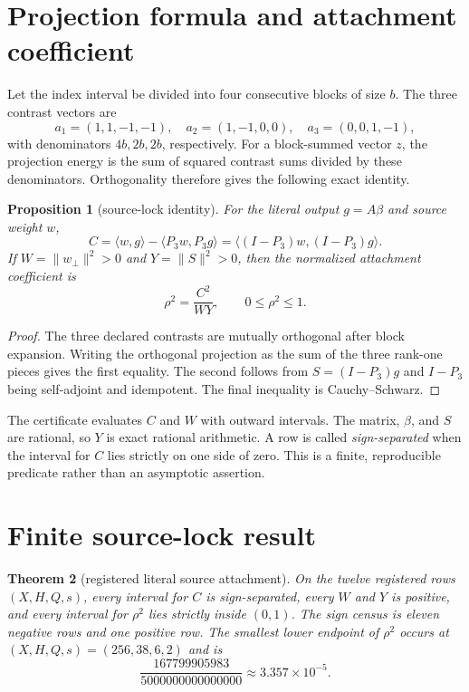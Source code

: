 \documentclass[11pt]{article}
\newtheorem{theorem}{Theorem}
\newtheorem{proposition}[theorem]{Proposition}
\begin{document}
\section{Projection formula and attachment coefficient}

Let the index interval be divided into four consecutive blocks of size $b$.
The three contrast vectors are
\[
 a_1=(1,1,-1,-1),\quad a_2=(1,-1,0,0),\quad
 a_3=(0,0,1,-1),
\]
with denominators $4b,2b,2b$, respectively.  For a block-summed vector $z$,
the projection energy is the sum of squared contrast sums divided by these
denominators.  Orthogonality therefore gives the following exact identity.

\begin{proposition}[source-lock identity]
For the literal output $g=A\beta$ and source weight $w$,
\[
 C=\langle w,g\rangle-\langle P_3w,P_3g\rangle
   =\langle (I-P_3)w,(I-P_3)g\rangle.
\]
If $W=\|w_\perp\|^2>0$ and $Y=\|S\|^2>0$, then the normalized attachment
coefficient is
\[
 \rho^2=\frac{C^2}{WY},\qquad 0\leq\rho^2\leq 1.
 \label{eq:rho}
\]
\end{proposition}

\begin{proof}
The three declared contrasts are mutually orthogonal after block expansion.
Writing the orthogonal projection as the sum of the three rank-one pieces
gives the first equality.  The second follows from $S=(I-P_3)g$ and
$I-P_3$ being self-adjoint and idempotent.  The final inequality is
Cauchy--Schwarz.
\end{proof}

The certificate evaluates $C$ and $W$ with outward intervals.  The matrix,
$\beta$, and $S$ are rational, so $Y$ is exact rational arithmetic.  A row is
called \emph{sign-separated} when the interval for $C$ lies strictly on one
side of zero.  This is a finite, reproducible predicate rather than an
asymptotic assertion.

\section{Finite source-lock result}

\begin{theorem}[registered literal source attachment]
On the twelve registered rows $(X,H,Q,s)$, every interval for $C$ is
sign-separated, every $W$ and $Y$ is positive, and every interval for $\rho^2$
lies strictly inside $(0,1)$.  The sign census is eleven negative rows and one
positive row.  The smallest lower endpoint of $\rho^2$ occurs at
$(X,H,Q,s)=(256,38,6,2)$ and is
\[
 \frac{167799905983}{5000000000000000}
 \approx 3.357\times10^{-5}.
\]
\end{theorem}
\end{document}
